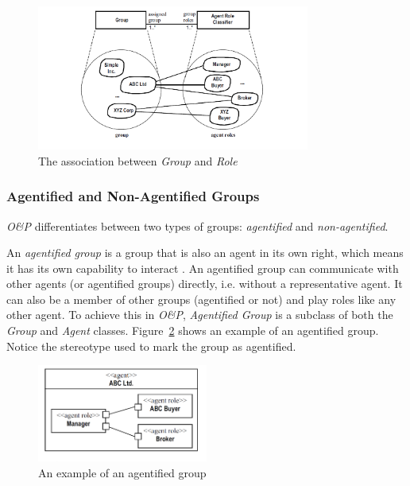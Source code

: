 \begin{figure}[ht]
	\centering
	\includegraphics[width=0.8\textwidth]{images/onp/group-role-association.png}
	\caption{The association between \textit{Group} and \textit{Role} \cite{Odell05}}
	\label{figure:onp-group-role-association}
\end{figure}

\subsubsection*{Agentified and Non-Agentified Groups}

\textit{O\&P} differentiates between two types of groups: \textit{agentified} and \textit{non-agentified}.

An \textit{agentified group} is a group that is also an agent in its own right, which means it has its own capability to interact \cite{Odell05}.
An agentified group can communicate with other agents (or agentified groups) directly, i.e. without a representative agent.
It can also be a member of other groups (agentified or not) and play roles like any other agent.
To achieve this in \textit{O\&P}, \textit{Agentified Group} is a subclass of both the \textit{Group} and \textit{Agent} classes.
Figure~\ref{figure:onp-agentified-group} shows an example of an agentified group.
Notice the  stereotype used to mark the group as agentified.

\begin{figure}[ht]
	\centering
	\includegraphics[width=0.5\textwidth]{images/onp/agentified-group.png}
	\caption{An example of an agentified group \cite{Odell05}}
	\label{figure:onp-agentified-group}
\end{figure}

